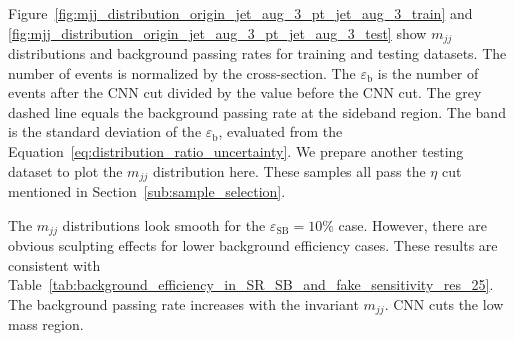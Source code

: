 \documentclass[12pt]{article}
\begin{document}
        Figure~\ref{fig:mjj_distribution_origin_jet_aug_3_pt_jet_aug_3_train} and \ref{fig:mjj_distribution_origin_jet_aug_3_pt_jet_aug_3_test} show $m_{jj}$ distributions and background passing rates for training and testing datasets. The number of events is normalized by the cross-section. The $\varepsilon_{\text{b}}$ is the number of events after the CNN cut divided by the value before the CNN cut. The grey dashed line equals the background passing rate at the sideband region. The band is the standard deviation of the $\varepsilon_{\text{b}}$, evaluated from the Equation~\ref{eq:distribution_ratio_uncertainty}. We prepare another testing dataset to plot the $m_{jj}$ distribution here. These samples all pass the $\eta$ cut mentioned in Section~\ref{sub:sample_selection}.

        The $m_{jj}$ distributions look smooth for the $\varepsilon_{\text{SB}} = 10\%$ case. However, there are obvious sculpting effects for lower background efficiency cases. These results are consistent with Table~\ref{tab:background_efficiency_in_SR_SB_and_fake_sensitivity_res_25}. The background passing rate increases with the invariant $m_{jj}$. CNN cuts the low mass region.
\end{document}

